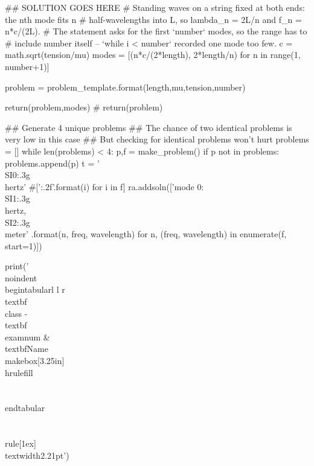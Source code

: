 \documentclass[12pt]{exam}
\newcommand{\class}{PHYS 110}
\newcommand{\examnum}{C10 (v2)}
\begin{document}
\begin{pycode}
	## SOLUTION GOES HERE
	# Standing waves on a string fixed at both ends: the nth mode fits n
	# half-wavelengths into L, so lambda_n = 2L/n and f_n = n*c/(2L).
	# The statement asks for the first `number` modes, so the range has to
	# include number itself -- `while i < number` recorded one mode too few.
	c = math.sqrt(tension/mu)
	modes = [(n*c/(2*length), 2*length/n) for n in range(1, number+1)]
	


	problem = problem_template.format(length,mu,tension,number)
	
	return(problem,modes)
#	return(problem)
	
## Generate 4 unique problems
## The chance of two identical problems is very low in this case
## But checking for identical problems won't hurt
problems = []
while len(problems) < 4:
    p,f = make_problem()
    if p not in problems:
        problems.append(p)
        t = '\\SI{{{0:.3g}}}{{\\hertz}}'
        #['{:.2f}'.format(i) for i in f]
        ra.addsoln(['mode {0}: \\SI{{{1:.3g}}}{{\\hertz}}, \\SI{{{2:.3g}}}{{\\meter}}'
                    .format(n, freq, wavelength)
                    for n, (freq, wavelength) in enumerate(f, start=1)])

print('\\noindent \\begin{tabular}{l l r} \\textbf{\\class} - \\textbf{\\examnum}  & \\textbf{Name} \\makebox[3.25in]{\\hrulefill}  \\\\ \\end{tabular} \\\\ \\rule[1ex]{\\textwidth}{2.21pt}')


\end{pycode}
\end{document}
